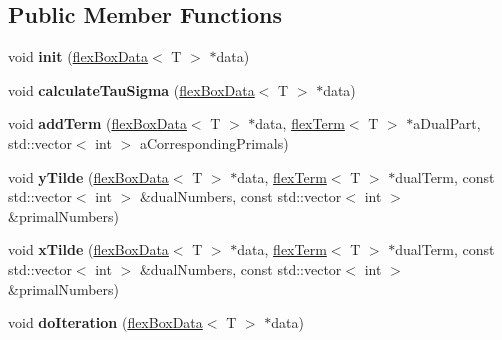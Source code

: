 \subsection*{Public Member Functions}
\begin{DoxyCompactItemize}
\item 
\mbox{\label{classflex_solver_primal_dual_a336d1da6eead54255c6f775f945246ba}} 
void {\bfseries init} (\hyperlink{classflex_box_data}{flex\+Box\+Data}$<$ T $>$ $\ast$data)
\item 
\mbox{\label{classflex_solver_primal_dual_a3247dd2a9af9b3acaccf93099ea6cad7}} 
void {\bfseries calculate\+Tau\+Sigma} (\hyperlink{classflex_box_data}{flex\+Box\+Data}$<$ T $>$ $\ast$data)
\item 
\mbox{\label{classflex_solver_primal_dual_aef2b795a7019f88dbfc335725ac9ae91}} 
void {\bfseries add\+Term} (\hyperlink{classflex_box_data}{flex\+Box\+Data}$<$ T $>$ $\ast$data, \hyperlink{classflex_term}{flex\+Term}$<$ T $>$ $\ast$a\+Dual\+Part, std\+::vector$<$ int $>$ a\+Corresponding\+Primals)
\item 
\mbox{\label{classflex_solver_primal_dual_a22ace8e6df1ab56e16bb196965f894e8}} 
void {\bfseries y\+Tilde} (\hyperlink{classflex_box_data}{flex\+Box\+Data}$<$ T $>$ $\ast$data, \hyperlink{classflex_term}{flex\+Term}$<$ T $>$ $\ast$dual\+Term, const std\+::vector$<$ int $>$ \&dual\+Numbers, const std\+::vector$<$ int $>$ \&primal\+Numbers)
\item 
\mbox{\label{classflex_solver_primal_dual_a78d23897067a5941ee58b7f45433831e}} 
void {\bfseries x\+Tilde} (\hyperlink{classflex_box_data}{flex\+Box\+Data}$<$ T $>$ $\ast$data, \hyperlink{classflex_term}{flex\+Term}$<$ T $>$ $\ast$dual\+Term, const std\+::vector$<$ int $>$ \&dual\+Numbers, const std\+::vector$<$ int $>$ \&primal\+Numbers)
\item 
\mbox{\label{classflex_solver_primal_dual_a6d072be7a02617f61011c50b13547d7a}} 
void {\bfseries do\+Iteration} (\hyperlink{classflex_box_data}{flex\+Box\+Data}$<$ T $>$ $\ast$data)
\item 
\mbox{\label{classflex_solver_primal_dual_a8358fe4f17725997a4fe178151ab7e8a}} 

\end{DoxyCompactItemize}
